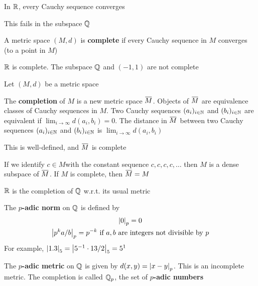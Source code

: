 \documentclass[11pt]{article}
\begin{document}
\begin{proposition}[]
In \(\mathbb{R}\), every Cauchy sequence converges
\end{proposition}

This fails in the subspace \(\mathbb{Q}\)

\begin{definition}[]
A metric space \((M,d)\) is \textbf{complete} if every Cauchy sequence in \(M\) converges (to a point in \(M\))
\end{definition}

\begin{examplle}[]
\(\mathbb{R}\) is complete. The subspace \(\mathbb{Q}\) and \((-1,1)\) are not complete
\end{examplle}

Let \((M,d)\) be a metric space

\begin{definition}[]
The \textbf{completion} of \(M\) is a new metric space \(\barM\). Objects of \(\barM\) are equivalence
classes of Cauchy sequences in \(M\). Two Cauchy sequences \((a_i)_{i\in\mathbb{N}}\) and \((b_i)_{i\in\mathbb{N}}\) are
equivalent if \(\lim_{i\to\infty}d(a_i,b_i)=0\). The distance in \(\barM\) between two Cauchy
sequences \((a_i)_{i\in\mathbb{N}}\) and \((b_i)_{i\in\mathbb{N}}\) is \(\lim_{i\to\infty}d(a_i,b_i)\)
\end{definition}

\begin{proposition}[]
This is well-defined, and \(\barM\) is complete
\end{proposition}

\begin{proposition}[]
If we identify \(c\in M\)with the constant sequence \(c,c,c,c,\dots\) then \(M\) is a dense subspace
of \(\barM\). If \(M\) is complete, then \(\barM=M\)
\end{proposition}

\begin{examplle}[]
\(\mathbb{R}\) is the completion of \(\mathbb{Q}\) w.r.t. its usual metric
\end{examplle}

\begin{examplle}[]
The \textbf{\(p\)-adic norm} on \(\mathbb{Q}\) is defined by
\begin{gather*}
\abs{0}_p=0\\
\abs{p^ka/b}_p=p^{-k}\text{ if }a,b\text{ are integers not divisible by }p
\end{gather*}
For example, \(\abs{1.3}_5=\abs{5^{-1}\cdot 13/2}_5=5^1\)

The \textbf{\(p\)-adic metric} on \(\mathbb{Q}\) is given by \(d(x,y)=\abs{x-y}_p\). This is an incomplete metric.
The completion is called \(\mathbb{Q}_p\), the set of \textbf{\(p\)-adic numbers}
\end{examplle}
\end{document}

